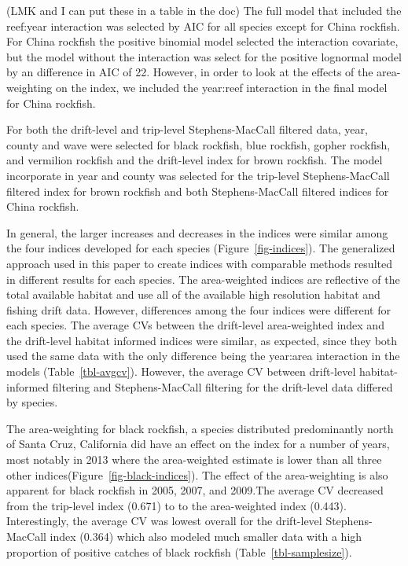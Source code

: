 \documentclass[
  12pt,
  authoryear,
  preprint,
  3p]{elsarticle}
\begin{document}
(LMK and I can put these in a table in the doc) The full model that
included the reef:year interaction was selected by AIC for all species
except for China rockfish. For China rockfish the positive binomial
model selected the interaction covariate, but the model without the
interaction was select for the positive lognormal model by an difference
in AIC of 22. However, in order to look at the effects of the
area-weighting on the index, we included the year:reef interaction in
the final model for China rockfish.

For both the drift-level and trip-level Stephens-MacCall filtered data,
year, county and wave were selected for black rockfish, blue rockfish,
gopher rockfish, and vermilion rockfish and the drift-level index for
brown rockfish. The model incorporate in year and county was selected
for the trip-level Stephens-MacCall filtered index for brown rockfish
and both Stephens-MacCall filtered indices for China rockfish.

In general, the larger increases and decreases in the indices were
similar among the four indices developed for each species
(Figure~\ref{fig-indices}). The generalized approach used in this paper
to create indices with comparable methods resulted in different results
for each species. The area-weighted indices are reflective of the total
available habitat and use all of the available high resolution habitat
and fishing drift data. However, differences among the four indices were
different for each species. The average CVs between the drift-level
area-weighted index and the drift-level habitat informed indices were
similar, as expected, since they both used the same data with the only
difference being the year:area interaction in the models
(Table~\ref{tbl-avgcv}). However, the average CV between drift-level
habitat-informed filtering and Stephens-MacCall filtering for the
drift-level data differed by species.

The area-weighting for black rockfish, a species distributed
predominantly north of Santa Cruz, California did have an effect on the
index for a number of years, most notably in 2013 where the
area-weighted estimate is lower than all three other
indices(Figure~\ref{fig-black-indices}). The effect of the
area-weighting is also apparent for black rockfish in 2005, 2007, and
2009.The average CV decreased from the trip-level index (0.671) to to
the area-weighted index (0.443). Interestingly, the average CV was
lowest overall for the drift-level Stephens-MacCall index (0.364) which
also modeled much smaller data with a high proportion of positive
catches of black rockfish (Table~\ref{tbl-samplesize}).
\end{document}
